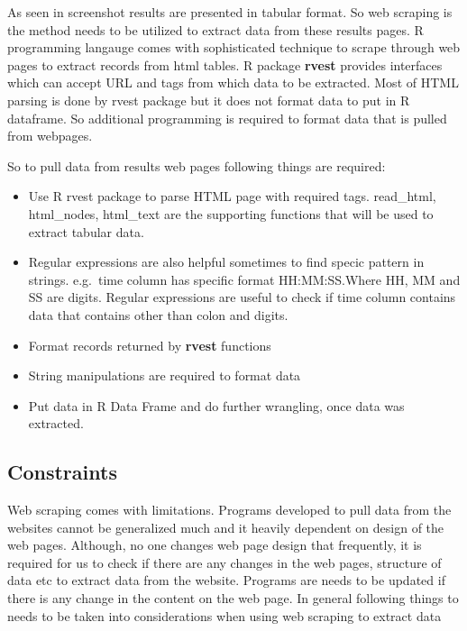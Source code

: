 \documentclass[
]{article}
\providecommand{\tightlist}{%
  \setlength{\itemsep}{0pt}\setlength{\parskip}{0pt}}
\begin{document}
As seen in screenshot results are presented in tabular format. So web
scraping is the method needs to be utilized to extract data from these
results pages. R programming langauge comes with sophisticated technique
to scrape through web pages to extract records from html tables. R
package \textbf{rvest} provides interfaces which can accept URL and tags
from which data to be extracted. Most of HTML parsing is done by rvest
package but it does not format data to put in R dataframe. So additional
programming is required to format data that is pulled from webpages.

So to pull data from results web pages following things are required:

\begin{itemize}
\tightlist
\item
  Use R rvest package to parse HTML page with required tags. read\_html,
  html\_nodes, html\_text are the supporting functions that will be used
  to extract tabular data.
\item
  Regular expressions are also helpful sometimes to find specic pattern
  in strings. e.g.~time column has specific format HH:MM:SS.Where HH, MM
  and SS are digits. Regular expressions are useful to check if time
  column contains data that contains other than colon and digits.
\item
  Format records returned by \textbf{rvest} functions
\item
  String manipulations are required to format data
\item
  Put data in R Data Frame and do further wrangling, once data was
  extracted.
\end{itemize}

\hypertarget{constraints}{%
\subsection{Constraints}\label{constraints}}

Web scraping comes with limitations. Programs developed to pull data
from the websites cannot be generalized much and it heavily dependent on
design of the web pages. Although, no one changes web page design that
frequently, it is required for us to check if there are any changes in
the web pages, structure of data etc to extract data from the website.
Programs are needs to be updated if there is any change in the content
on the web page. In general following things to needs to be taken into
considerations when using web scraping to extract data
\end{document}
